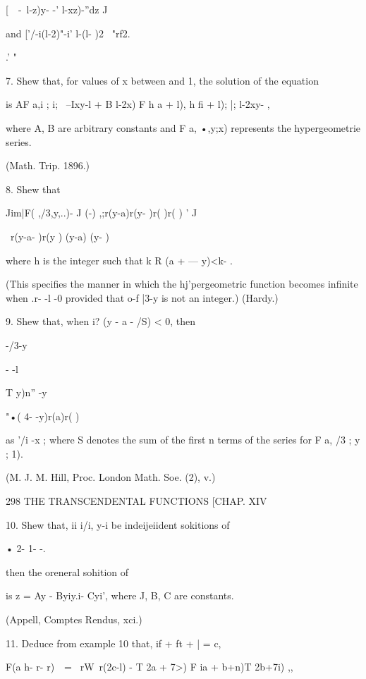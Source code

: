 [\ \  -\ l-z)y- -'  l-xz)-''dz 
J 

and ['/-i(l-2)"-i' l-(l- )2 ~"rf2. 

.' " 

7. Shew that, for values of x between and 1, the solution of the equation 

is AF  a,i ; i;  \ --Ixy-l + B  l-2x) F  h a + l), h fi + l); |;  l-2xy- , 

where A, B are arbitrary constants and F a,  •,y;x) represents the hypergeometrie series. 

(Math. Trip. 1896.) 

8. Shew that 

Jim|F( ,/3,y,..)- J (-) ,;r(y-a)r(y- )r( )r( )  '   J 

\  r(y-a- )r(y ) 
 (y-a) (y- ) 

where h is the integer such that k   R (a +   — y)<k- .  

(This specifies the manner in which the hj'pergeometric function becomes infinite when 
.r- -l -0 provided that o-f |3-y is not an integer.) (Hardy.) 



9. Shew that, when i? (y - a - /S) < 0, then 

-/3-y 

- -l 



T y)n'' -y 



 "•( 4- -y)r(a)r( ) 

as '/i -x ; where S  denotes the sum of the first n terms of the series for F a, /3 ; y ; 1). 

(M. J. M. Hill, Proc. London Math. Soe. (2), v.) 



298 THE TRANSCENDENTAL FUNCTIONS [CHAP. XIV 

10. Shew that, ii i/i, y-i be indeijeiident sokitions of 



• 2- 1- -. 



then the oreneral sohition of 



is z = Ay - Byiy.i- Cyi', where J, B, C are constants. 

(Appell, Comptes Rendus, xci.) 

11. Deduce from example 10 that, if   + ft + | = c, 

 F(a h- r- r)\ \  =  \ rW\ r(2c-l) - T  2a + 7>) F ia + b+n)T  2b+7i)  ,, 

